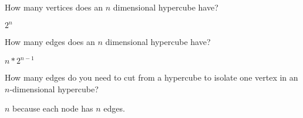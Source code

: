 \question How many vertices does an $n$ dimensional hypercube have?
\begin{solution}[0.6in] $2^n$
\end{solution}

\question How many edges does an $n$ dimensional hypercube have?
\begin{solution}[0.6in] $n * 2^{n-1}$
\end{solution}

\question How many edges do you need to cut from a hypercube 
to isolate one vertex in an $n$-dimensional hypercube? 
\begin{solution}[0.6in] $n$ because each node has $n$ edges.
\end{solution}